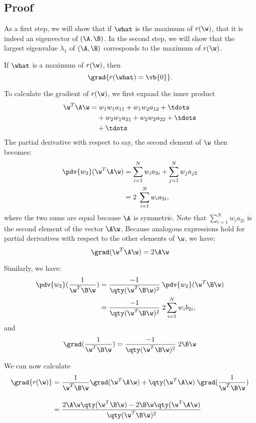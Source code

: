\subsection{Proof}

As a first step, we will show that if $\what$ is the maximum of $r(\w)$, that
it is indeed an eigenvector of $(\A,\B)$. In the second step, we will show
that the largest eigenvalue $\lambda_1$ of $(\A,\B)$ corresponds to the
maximum of $r(\w)$.

If $\what$ is a maximum of $r(\w)$, then
\begin{equation}
\label{eq:critical}
\grad{r(\what) = \vb{0}}.
\end{equation}

To calculate the gradient of $r(\w)$, we first expand the inner product
\begin{equation*}
\begin{split}
\w^T \A \w = & \; w_1 w_1 a_{11} + w_1 w_2 a_{12} + \tdots \\
                 & +  w_2 w_1 a_{21} + w_2 w_2 a_{22} + \tdots \\
                 & +  \tdots
\end{split}
\end{equation*}
%
The partial derivative with respect to say, the second element of $\w$ then
becomes:
\begin{align*}
\pdv{w_2}(\w^T \A \w) &= \sum_{i=1}^N w_i a_{2i} 
                             + \sum_{j=1}^N w_j a_{j2} \\
                          &= 2 \; \sum_{i=1}^N w_i a_{2i},
\end{align*}
where the two sums are equal because $\A$ is symmetric. Note that
$\sum_{i=1}^N w_i a_{2i}$ is the second element of the vector $\A \w$.
Because analogous expressions hold for partial derivatives with respect to
the other elements of $\w$, we have:
\[
\grad(\w^T \A \w) = 2 \A \w
\]

Similarly, we have:
\begin{align*}
\pdv{w_2}(\frac{1}{\w^T \B \w})
    &= \frac{-1}{\qty(\w^T \B \w)^2} \; \pdv{w_2}(\w^T \B \w) \\
    &= \frac{-1}{\qty(\w^T \B \w)^2} \; 2 \sum_{i=1}^N w_i b_{2i},
\end{align*}
and
\[
\grad(\frac{1}{\w^T \B \w})
    = \frac{-1}{\qty(\w^T \B \w)^2} \; 2 \B \w
\]

We can now calculate
\begin{align*}
\grad{r(\w)} &= \frac{1}{\w^T \B \w} \grad(\w^T \A \w)
                + \qty(\w^T \A \w) \; 
                  \grad(\frac{1}{\w^T \B \w})  \\[1em]
             &= \frac{2 \A \w \qty(\w^T \B \w) 
                      - 2 \B \w \qty(\w^T \A \w)}
                     {\qty(\w^T \B \w)^2}
\end{align*}


